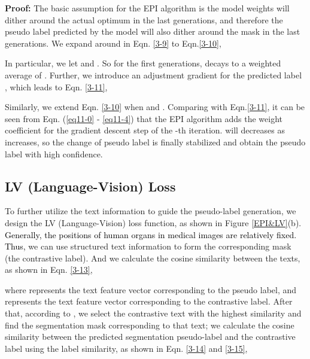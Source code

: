 \documentclass[lettersize,journal]{IEEEtran}
\begin{document}
\textbf{Proof:} The basic assumption for the EPI algorithm is the model weights will dither around the actual optimum in the last  generations, and therefore the pseudo label predicted by the model will also dither around the mask in the last  generations. We expand  around  in Eqn. \ref{3-9} to Eqn.\ref{3-10},
\vspace{1mm}


In particular, we let  and . So for the first  generations,  decays to a weighted average of . Further, we introduce an adjustment gradient  for the predicted label , which leads to Eqn. \ref{3-11},

Similarly, we extend Eqn. \ref{3-10} when  and . 
Comparing with Eqn.\ref{3-11}, it can be seen from Eqn. (\ref{eq11-0} - \ref{eq11-4}) that the EPI algorithm adds the weight coefficient  for the gradient descent step of the -th iteration.  will decreases as  increases, so the change of pseudo label is finally stabilized and obtain the pseudo label with high confidence. 

\vspace{-3mm}

    


\subsection{LV (Language-Vision) Loss}
To further utilize the text information to guide the pseudo-label generation, we design the LV (Language-Vision) loss function, as shown in Figure \ref{EPI&LV}(b). \textcolor{black}{
Generally, the positions of human organs in medical images are relatively fixed. Thus,} we can use structured text information to form the corresponding mask (the contrastive label). And we calculate the cosine similarity between the texts, as shown in Eqn. \ref{3-13},

where  represents the text feature vector corresponding to the pseudo label, and  represents the text feature vector corresponding to the contrastive label. After that, according to , we select the contrastive text with the highest similarity and find the segmentation mask corresponding to that text; we calculate the cosine similarity between the predicted segmentation pseudo-label and the contrastive label using the label similarity, as shown in Eqn. \ref{3-14} and \ref{3-15},
\end{document}
